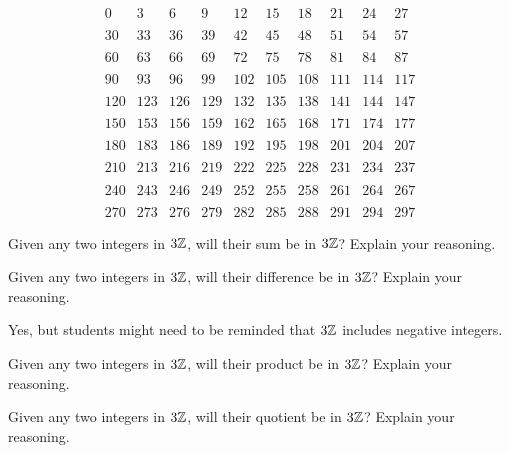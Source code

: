 \documentclass{ximera}
\begin{document}
\[
\begin{array}{cccccccccc}
0   & 3   & 6   & 9   & 12  & 15  & 18  & 21  & 24  & 27  \\
\\
30  & 33  & 36  & 39  & 42  & 45  & 48  & 51  & 54  & 57  \\
\\
60  & 63  & 66  & 69  & 72  & 75  & 78  & 81  & 84  & 87  \\
\\
90  & 93  & 96  & 99  & 102 & 105 & 108 & 111 & 114 & 117 \\
\\
120 & 123 & 126 & 129 & 132 & 135 & 138 & 141 & 144 & 147 \\
\\
150 & 153 & 156 & 159 & 162 & 165 & 168 & 171 & 174 & 177 \\
\\
180 & 183 & 186 & 189 & 192 & 195 & 198 & 201 & 204 & 207 \\
\\
210 & 213 & 216 & 219 & 222 & 225 & 228 & 231 & 234 & 237 \\
\\
240 & 243 & 246 & 249 & 252 & 255 & 258 & 261 & 264 & 267 \\
\\
270 & 273 & 276 & 279 & 282 & 285 & 288 & 291 & 294 & 297
\end{array}
\]



\begin{problem}
Given any two integers in $3\mathbb Z$, will their sum be in $3\mathbb Z$? Explain
your reasoning.
\end{problem}

\begin{problem}
Given any two integers in $3\mathbb Z$, will their difference be in $3\mathbb Z$?
Explain your reasoning.
\end{problem}
\begin{teachingnote}
Yes, but students might need to be reminded that $3\mathbb Z$ includes negative integers.  
\end{teachingnote}

\begin{problem}
Given any two integers in $3\mathbb Z$, will their product be in $3\mathbb Z$?
Explain your reasoning.
\end{problem}

\begin{problem}
Given any two integers in $3\mathbb Z$, will their quotient be in $3\mathbb Z$?
Explain your reasoning.
\end{problem}
\end{document}
